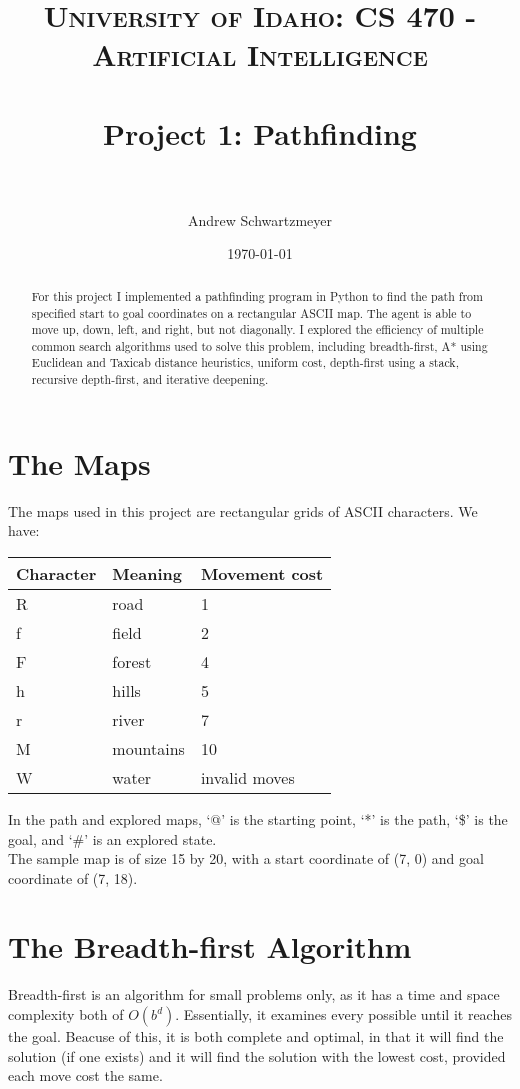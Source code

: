 \documentclass[12pt, article]{scrartcl}
\title{	
\normalfont \normalsize 
\textsc{University of Idaho: CS 470 - Artificial Intelligence} \\ [25pt]
\horrule{0.5pt} \\[0.4cm]
\huge Project 1: Pathfinding\\
\horrule{2pt} \\[0.5cm]
}
\author{Andrew Schwartzmeyer}
\date{\normalsize\today}
\begin{document}
\maketitle %
\begin{abstract}
For this project I implemented a pathfinding program in Python to find the path from specified start to goal coordinates on a rectangular ASCII map. The agent is able to move up, down, left, and right, but not diagonally. I explored the efficiency of multiple common search algorithms used to solve this problem, including breadth-first, A* using Euclidean and Taxicab distance heuristics, uniform cost, depth-first using a stack, recursive depth-first, and iterative deepening.
\end{abstract}
\pagebreak
\section{The Maps}
The maps used in this project are rectangular grids of ASCII characters. We have:
\begin{center}
\begin{tabular}{l | l | l}
Character & Meaning & Movement cost \\ \hline
R & road & 1 \\
f & field & 2 \\
F & forest & 4 \\
h & hills & 5 \\
r & river & 7 \\
M & mountains & 10 \\
W & water & invalid moves \\
\end{tabular}
\end{center}

In the path and explored maps, `@' is the starting point, `*' is the path, `\$' is the goal, and `\#' is an explored state. \\ 

The sample map is of size 15 by 20, with a start coordinate of (7, 0) and goal coordinate of (7, 18). \\

\section{The Breadth-first Algorithm}
Breadth-first is an algorithm for small problems only, as it has a time and space complexity both of $O(b^{d})$. Essentially, it examines every possible until it reaches the goal. Beacuse of this, it is both complete and optimal, in that it will find the solution (if one exists) and it will find the solution with the lowest cost, provided each move cost the same. \\
\end{document}
